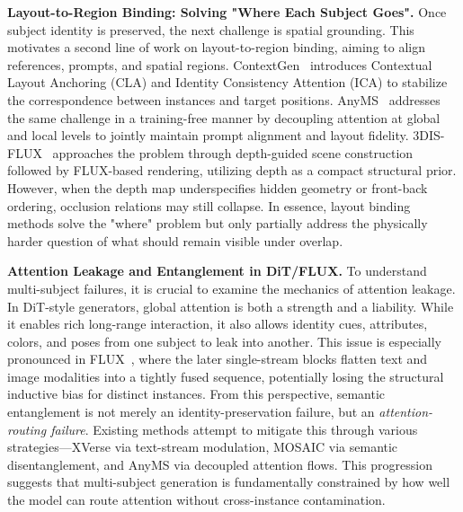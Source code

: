 \textbf{Layout-to-Region Binding: Solving "Where Each Subject Goes".} 
Once subject identity is preserved, the next challenge is spatial grounding. This motivates a second line of work on layout-to-region binding, aiming to align references, prompts, and spatial regions. ContextGen~\cite{contextgen2024} introduces Contextual Layout Anchoring (CLA) and Identity Consistency Attention (ICA) to stabilize the correspondence between instances and target positions. AnyMS~\cite{anyms2024} addresses the same challenge in a training-free manner by decoupling attention at global and local levels to jointly maintain prompt alignment and layout fidelity. 3DIS-FLUX~\cite{3disflux2024} approaches the problem through depth-guided scene construction followed by FLUX-based rendering, utilizing depth as a compact structural prior. However, when the depth map underspecifies hidden geometry or front-back ordering, occlusion relations may still collapse. In essence, layout binding methods solve the "where" problem but only partially address the physically harder question of what should remain visible under overlap.

\textbf{Attention Leakage and Entanglement in DiT/FLUX.} 
To understand multi-subject failures, it is crucial to examine the mechanics of attention leakage. In DiT-style generators, global attention is both a strength and a liability. While it enables rich long-range interaction, it also allows identity cues, attributes, colors, and poses from one subject to leak into another. This issue is especially pronounced in FLUX~\cite{flux2024}, where the later single-stream blocks flatten text and image modalities into a tightly fused sequence, potentially losing the structural inductive bias for distinct instances. From this perspective, semantic entanglement is not merely an identity-preservation failure, but an \textit{attention-routing failure}. Existing methods attempt to mitigate this through various strategies—XVerse via text-stream modulation, MOSAIC via semantic disentanglement, and AnyMS via decoupled attention flows. This progression suggests that multi-subject generation is fundamentally constrained by how well the model can route attention without cross-instance contamination.

